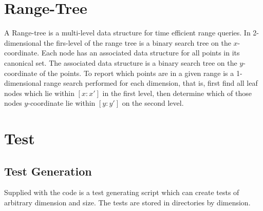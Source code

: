 \documentclass{article}
\begin{document}
\section{Range-Tree}
  A Range-tree is a multi-level data structure for time efficient range queries.
  In 2-dimensional the firs-level of the range tree is a binary search tree on 
  the $x$-coordinate. Each node has an associated data structure for all
  points in its canonical set. The associated data structure is a binary 
  search tree on the $y$-coordinate of the points. 
  To report which points are in a given range is a 1-dimensional range search 
  performed for each dimension, that is, first find all leaf nodes which lie 
  within $[x:x']$ in the first level, then determine which of those nodes 
  $y$-coordinate lie within $[y:y']$ on the second level. 
 \section{Test}
    \subsection{Test Generation}
    Supplied with the code is a test generating script which can create tests of
    arbitrary dimension and size. The tests are stored in directories by 
    dimension.
    
\end{document}
